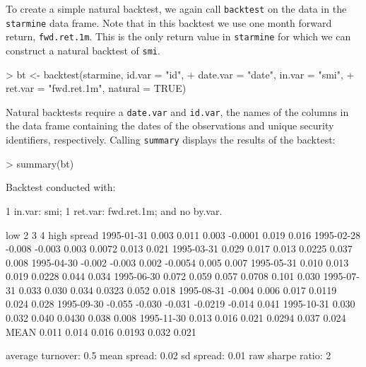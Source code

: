 \documentclass[a4paper]{report}
\begin{document}
\begin{article}
To create a simple natural backtest, we again call \texttt{backtest}
on the data in the \texttt{starmine} data frame.  Note that in this
backtest we use one month forward return, \texttt{fwd.ret.1m}.  This
is the only return value in \texttt{starmine} for which we can
construct a natural backtest of \texttt{smi}.

\begin{Schunk}
\begin{Sinput}
> bt <- backtest(starmine, id.var = "id", 
+     date.var = "date", in.var = "smi", 
+     ret.var = "fwd.ret.1m", natural = TRUE)
\end{Sinput}
\end{Schunk}

Natural backtests require a \texttt{date.var} and \texttt{id.var}, the
names of the columns in the data frame containing the dates of the
observations and unique security identifiers, respectively.  Calling
\texttt{summary} displays the results of the backtest:



\begin{Schunk}
\begin{Sinput}
> summary(bt)
\end{Sinput}
\begin{Soutput}
Backtest conducted with:

1 in.var: smi;
1 ret.var: fwd.ret.1m;
and no by.var.

              low      2      3       4   high spread
1995-01-31  0.003  0.011  0.003 -0.0001  0.019  0.016
1995-02-28 -0.008 -0.003  0.003  0.0072  0.013  0.021
1995-03-31  0.029  0.017  0.013  0.0225  0.037  0.008
1995-04-30 -0.002 -0.003  0.002 -0.0054  0.005  0.007
1995-05-31  0.010  0.013  0.019  0.0228  0.044  0.034
1995-06-30  0.072  0.059  0.057  0.0708  0.101  0.030
1995-07-31  0.033  0.030  0.034  0.0323  0.052  0.018
1995-08-31 -0.004  0.006  0.017  0.0119  0.024  0.028
1995-09-30 -0.055 -0.030 -0.031 -0.0219 -0.014  0.041
1995-10-31  0.030  0.032  0.040  0.0430  0.038  0.008
1995-11-30  0.013  0.016  0.021  0.0294  0.037  0.024
MEAN        0.011  0.014  0.016  0.0193  0.032  0.021

average turnover: 0.5
mean spread: 0.02
sd spread: 0.01
raw sharpe ratio: 2
\end{Soutput}
\end{Schunk}




\end{article}
\end{document}
